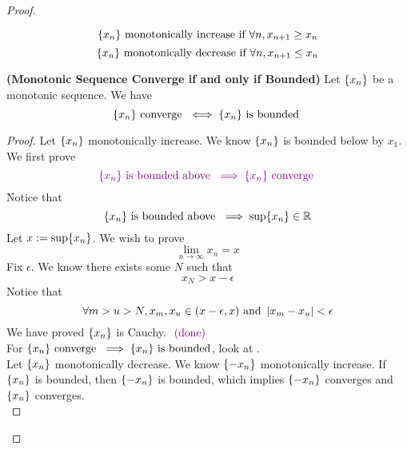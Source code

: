 \documentclass{report}
\begin{document}
\begin{proof}
\begin{definition}
\begin{equation}
\{ x_n \}\text{ monotonically increase if }\forall n, x_{n+1}\geq x_n
\end{equation}
\begin{equation}
\{ x_n \}\text{ monotonically decrease if }\forall n, x_{n+1}\leq x_n
\end{equation}
\end{definition}
\begin{theorem}
\label{2.2.10}
\textbf{(Monotonic Sequence Converge if and only if Bounded)} Let $\{ x_n \}$ be a monotonic sequence. We have
\begin{equation}
\{ x_n \}\text{ converge }\iff \{ x_n \}\text{ is bounded }
\end{equation}
\end{theorem}
\begin{proof}
Let $\{ x_n \}$ monotonically increase. We know $\{ x_n \}$ is bounded below by $x_1$. We first prove
\begin{equation}
  \textcolor{violet}{\{ x_n \}\text{ is bounded above }\implies \{ x_n \}\text{ converge }}
\end{equation}
Notice that
\begin{equation}
\{ x_n \}\text{ is bounded above }\implies \sup \{ x_n \}\in\mathbb{R}
\end{equation}
Let $x:=\sup \{ x_n \}$. We wish to prove
\begin{equation}
\lim_{n\to\infty}x_n=x
\end{equation}
Fix $\epsilon $. We know there exists some $N$ such that
 \begin{equation}
x_N>x-\epsilon 
\end{equation}
Notice that
\begin{equation}
\forall m>u>N, x_m,x_u\in (x-\epsilon ,x)\text{ and }\left|x_m-x_u\right|<\epsilon 
\end{equation}
We have proved $\{ x_n \}$ is Cauchy. $\textcolor{violet}{\text{ (done) }}$\\


For $\{ x_n \}\text{ converge }\implies \{ x_n \}\text{ is bounded}$, look at .\\

Let $\{ x_n \}$ monotonically decrease. We know $\{ -x_n \}$ monotonically increase. If $\{ x_n \}$ is bounded, then $\{ -x_n \}$ is bounded, which implies $\{ -x_n \}$ converges and $\{ x_n \}$ converges.\\


\end{proof}
\end{proof}
\end{document}
